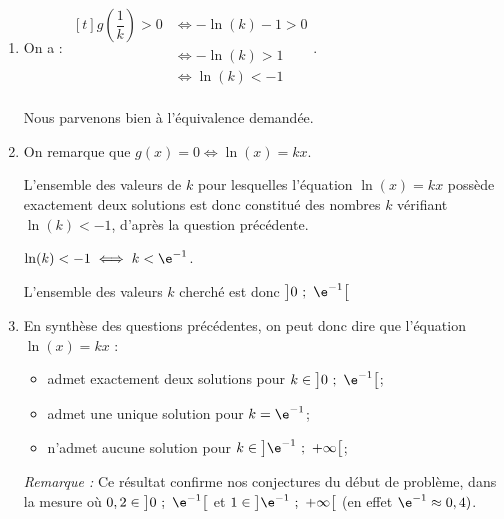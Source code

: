 \begin{enumerate}
\begin{enumerate}
\item On a :
$\begin{aligned}[t] g\left(\dfrac 1k\right) > 0 &\iff -\ln(k) - 1 > 0\\
&\iff -\ln (k) >  1\\
&\iff \ln(k) < -1 \\ \end{aligned}$.

Nous parvenons bien à l'équivalence demandée.

\item On remarque que $g(x) = 0 \iff \ln(x) = kx$.

L'ensemble des valeurs de $k$ pour lesquelles l'équation $\ln (x) = kx$ possède exactement deux solutions est donc constitué des nombres $k$ vérifiant $\ln(k) < -1$, d'après la question précédente.

$\ln(k) < -1 \iff k < \e^{-1}$.

L'ensemble des valeurs $k$ cherché est donc $\left]0~;~\e^{-1}\right[ $
	\item En synthèse des questions précédentes, on peut donc dire que  l'équation $\ln (x) = kx$ :
			\begin{itemize}
				\item admet exactement deux solutions pour $ k\in \left]0~;~\e^{-1}\right[$;
				\item admet une unique solution pour $ k = \e^{-1}$;
				\item n'admet aucune solution pour $ k\in \left]\e^{-1}~;~+\infty\right[$;
			\end{itemize}
		\emph{Remarque :} Ce résultat confirme nos conjectures du début de problème, dans la mesure où $0,2 \in \left]0~;~\e^{-1}\right[$ et $1\in \left]\e^{-1}~;~+\infty\right[$ (en effet $\e^{-1}\approx 0,4)$.
		\end{enumerate}
	\end{enumerate}

	\medskip
